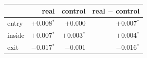 \begin{tabular}{@{}l r r r@{}}
\toprule
 & real & control & real $-$ control \\
\midrule
entry & $+$0.008$^\ast$ & $+$0.000 & $+$0.007$^\ast$ \\
inside & $+$0.007$^\ast$ & $+$0.003$^\ast$ & $+$0.004$^\ast$ \\
exit & $-$0.017$^\ast$ & $-$0.001 & $-$0.016$^\ast$  \\
\bottomrule
\end{tabular}

